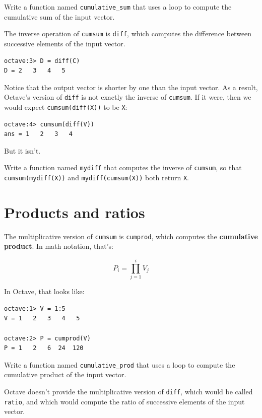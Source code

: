 \documentclass{book}
\begin{document}
\begin{ex}
Write a function named {\tt cumulative\_sum} that uses
a loop to compute the cumulative sum of the input vector.
\end{ex}

The inverse operation of {\tt cumsum} is {\tt diff}, which computes
the difference between successive elements of the input vector.

\begin{verbatim}
octave:3> D = diff(C)
D = 2   3   4   5
\end{verbatim}

Notice that the output vector is shorter by one than the input
vector. As a result, Octave's version of {\tt diff} is not
exactly the inverse of {\tt cumsum}. If it were, then we would
expect {\tt cumsum(diff(X))} to be {\tt X}:

\begin{verbatim}
octave:4> cumsum(diff(V))
ans = 1   2   3   4
\end{verbatim}

But it isn't.

\begin{ex}
Write a function named {\tt mydiff} that computes the
inverse of {\tt cumsum}, so that {\tt cumsum(mydiff(X))} and
{\tt mydiff(cumsum(X))} both
return {\tt X}.
\end{ex}


\section{Products and ratios}

The multiplicative version of {\tt cumsum} is {\tt cumprod},
which computes the {\bf cumulative product}. In math notation,
that's:

\[ P_i = \prod_{j=1}^i V_j \]

In Octave, that looks like:

\begin{verbatim}
octave:1> V = 1:5
V = 1   2   3   4   5

octave:2> P = cumprod(V)
P = 1   2   6  24  120
\end{verbatim}

\begin{ex}
Write a function named {\tt cumulative\_prod} that uses
a loop to compute the cumulative product of the input vector.
\end{ex}

Octave doesn't provide the multiplicative version
of {\tt diff}, which would be called {\tt ratio}, and which would
compute the ratio of successive elements of the input vector.
\end{document}
